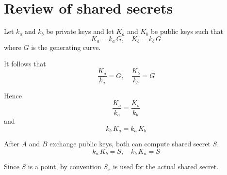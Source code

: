 \documentclass[12pt]{article}
\begin{document}
\section*{Review of shared secrets}

Let $k_a$ and $k_b$ be private keys and let $K_a$ and $K_b$ be public keys such that
\begin{equation*}
K_a=k_a\,G,\quad K_b=k_b\,G
\end{equation*}
where $G$ is the generating curve.

\bigskip
It follows that
\begin{equation*}
\frac{K_a}{k_a}=G,\quad \frac{K_b}{k_b}=G
\end{equation*}

Hence
\begin{equation*}
\frac{K_a}{k_a}=\frac{K_b}{k_b}
\end{equation*}
and
\begin{equation*}
k_b\,K_a=k_a\,K_b
\end{equation*}

After $A$ and $B$ exchange public keys, both can compute shared secret $S$.
\begin{equation*}
k_a\,K_b=S,\quad k_b\,K_a=S
\end{equation*}

Since $S$ is a point, by convention $S_x$ is used for the actual shared secret.
\end{document}
